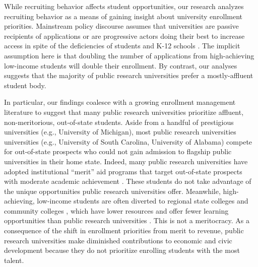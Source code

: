 \documentclass[twoside]{article}
\begin{document}
While recruiting behavior affects student opportunities, our research analyzes recruiting behavior as a means of gaining insight about university enrollment priorities.  Mainstream policy discourse assumes that universities are passive recipients of applications or are progressive actors doing their best to increase access in spite of the deficiencies of students and K-12 schools \cite{RN4016, RN4017}.  The implicit assumption here is that doubling the number of applications from high-achieving low-income students will double their enrollment. By contrast, our analyses suggests that the majority of public research universities prefer a mostly-affluent student body.

In particular, our findings coalesce with a growing enrollment management literature \citep[e.g., ][]{RN3685,RN3528,RN4409,RN4032} to suggest that many public research universities prioritize affluent, non-meritorious, out-of-state students. Aside from a handful of prestigious universities (e.g., University of Michigan), most public research universities universities (e.g., University of South Carolina, University of Alabama) compete for out-of-state prospects who could not gain admission to flagship public universities in their home state.  Indeed, many public research universities have adopted institutional ``merit'' aid programs that target out-of-state prospects with moderate academic achievement \citep{RN1469,RN3762,RN4032,RN4409}. These students do not take advantage of the unique opportunities public research universities offer.  Meanwhile, high-achieving, low-income students are often diverted to regional state colleges and community colleges \citep{RN4429}, which have lower resources and offer fewer learning opportunities than public research universities \citep{RN532,RN1545}.  This is not a meritocracy.  As a consequence of the shift in enrollment priorities from merit to revenue, public research universities make diminished contributions to economic and civic development because they do not prioritize enrolling students with the most talent.
\end{document}
